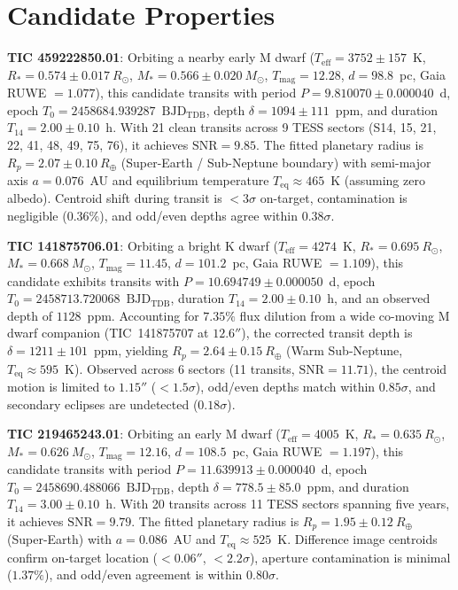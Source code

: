 ﻿\documentclass[modern]{aastex631}
\newcommand{\rearth}{R_\oplus}
\newcommand{\rsun}{R_\odot}
\newcommand{\msun}{M_\odot}
\begin{document}
\section{Candidate Properties}

\textbf{TIC 459222850.01}: Orbiting a nearby early M dwarf ($T_{\mathrm{eff}} = 3752 \pm 157$~K, $R_* = 0.574 \pm 0.017~\rsun$, $M_* = 0.566 \pm 0.020~\msun$, $T_{\mathrm{mag}} = 12.28$, $d = 98.8$~pc, Gaia RUWE $= 1.077$), this candidate transits with period $P = 9.810070 \pm 0.000040$~d, epoch $T_0 = 2458684.939287$~$\mathrm{BJD_{TDB}}$, depth $\delta = 1094 \pm 111$~ppm, and duration $T_{14} = 2.00 \pm 0.10$~h. With 21 clean transits across 9 TESS sectors (S14, 15, 21, 22, 41, 48, 49, 75, 76), it achieves $\mathrm{SNR} = 9.85$. The fitted planetary radius is $R_p = 2.07 \pm 0.10~\rearth$ (Super-Earth / Sub-Neptune boundary) with semi-major axis $a = 0.076$~AU and equilibrium temperature $T_{\mathrm{eq}} \approx 465$~K (assuming zero albedo). Centroid shift during transit is $<3\sigma$ on-target, contamination is negligible ($0.36\%$), and odd/even depths agree within $0.38\sigma$.

\textbf{TIC 141875706.01}: Orbiting a bright K dwarf ($T_{\mathrm{eff}} = 4274$~K, $R_* = 0.695~\rsun$, $M_* = 0.668~\msun$, $T_{\mathrm{mag}} = 11.45$, $d = 101.2$~pc, Gaia RUWE $= 1.109$), this candidate exhibits transits with $P = 10.694749 \pm 0.000050$~d, epoch $T_0 = 2458713.720068$~$\mathrm{BJD_{TDB}}$, duration $T_{14} = 2.00 \pm 0.10$~h, and an observed depth of $1128$~ppm. Accounting for $7.35\%$ flux dilution from a wide co-moving M dwarf companion (TIC~141875707 at $12.6''$), the corrected transit depth is $\delta = 1211 \pm 101$~ppm, yielding $R_p = 2.64 \pm 0.15~\rearth$ (Warm Sub-Neptune, $T_{\mathrm{eq}} \approx 595$~K). Observed across 6 sectors (11 transits, $\mathrm{SNR} = 11.71$), the centroid motion is limited to $1.15''$ ($<1.5\sigma$), odd/even depths match within $0.85\sigma$, and secondary eclipses are undetected ($0.18\sigma$).

\textbf{TIC 219465243.01}: Orbiting an early M dwarf ($T_{\mathrm{eff}} = 4005$~K, $R_* = 0.635~\rsun$, $M_* = 0.626~\msun$, $T_{\mathrm{mag}} = 12.16$, $d = 108.5$~pc, Gaia RUWE $= 1.197$), this candidate transits with period $P = 11.639913 \pm 0.000040$~d, epoch $T_0 = 2458690.488066$~$\mathrm{BJD_{TDB}}$, depth $\delta = 778.5 \pm 85.0$~ppm, and duration $T_{14} = 3.00 \pm 0.10$~h. With 20 transits across 11 TESS sectors spanning five years, it achieves $\mathrm{SNR} = 9.79$. The fitted planetary radius is $R_p = 1.95 \pm 0.12~\rearth$ (Super-Earth) with $a = 0.086$~AU and $T_{\mathrm{eq}} \approx 525$~K. Difference image centroids confirm on-target location ($<0.06''$, $<2.2\sigma$), aperture contamination is minimal ($1.37\%$), and odd/even agreement is within $0.80\sigma$.
\end{document}
